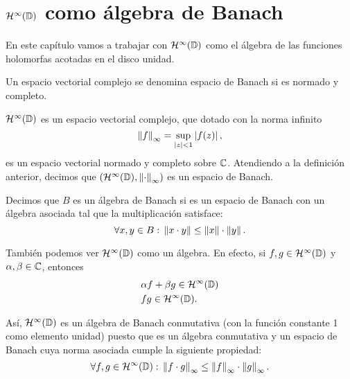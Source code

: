 \chapter{$\mathcal{H}^{\infty}(\mathbb{D})$ como álgebra de Banach}

En este capítulo vamos a trabajar con $\mathcal{H}^{\infty}(\mathbb{D})$ como el álgebra de las funciones holomorfas acotadas en el disco unidad. \\

\begin{definition}
    Un espacio vectorial complejo se denomina espacio de Banach si es normado y completo.
\end{definition}

\medskip
$\mathcal{H}^{\infty}(\mathbb{D})$ es un espacio vectorial complejo, que dotado con la norma infinito
\begin{equation*}
    \left\lVert f\right\rVert_{\infty} = \sup_{\left\lvert z\right\rvert < 1} \left\lvert f(z)\right\rvert,
\end{equation*}
es un espacio vectorial normado y completo sobre $\mathbb{C}$. Atendiendo a la definición anterior, decimos que  $(\mathcal{H}^{\infty}(\mathbb{D}), \left\lVert\cdot\right\rVert_{\infty})$ es un espacio de Banach. \\

\begin{definition}
    Decimos que $B$ es un álgebra de Banach si es un espacio de Banach con un álgebra asociada tal que la multiplicación satisface:
    \begin{equation*}
        \forall x, y \in B: \, \left\lVert x \cdot y\right\rVert \leq \left\lVert x\right\rVert \cdot \left\lVert y\right\rVert.
    \end{equation*}
\end{definition}

\medskip
También podemos ver $\mathcal{H}^{\infty}(\mathbb{D})$ como un álgebra. En efecto, si $f, g \in \mathcal{H}^{\infty}(\mathbb{D})$ y $\alpha, \beta \in \mathbb{C}$, entonces
\begin{equation*}
    \begin{split}
        & \alpha f + \beta g \in \mathcal{H}^{\infty}(\mathbb{D}) \\
        & fg \in \mathcal{H}^{\infty}(\mathbb{D}).
    \end{split}
\end{equation*}

Así, $\mathcal{H}^{\infty}(\mathbb{D})$ es un álgebra de Banach conmutativa (con la función constante 1 como elemento unidad) puesto que es un álgebra conmutativa y un espacio de Banach cuya norma asociada cumple la siguiente propiedad:
\begin{equation*}
    \forall f, g \in \mathcal{H}^{\infty}(\mathbb{D}): \, \left\lVert f \cdot g\right\rVert_{\infty} \leq \left\lVert f\right\rVert_{\infty} \cdot \left\lVert g\right\rVert_{\infty}.
\end{equation*} \\

